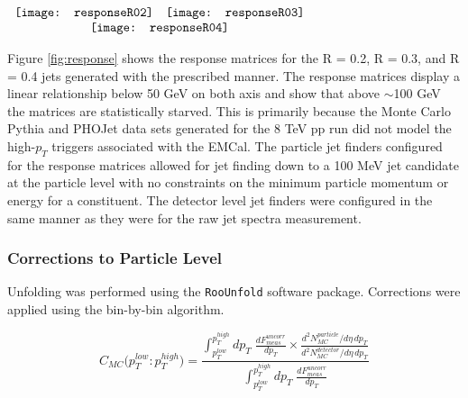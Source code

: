 \begin{figure*}[t!]
$\begin{array}{rl}
    \texttt{[image: responseR02]} &
    \texttt{[image: responseR03]}\\
    \multicolumn{2}{c}{\texttt{[image: responseR04]}}
\end{array}$
\caption[Response Matrices for R = 0.2, R=0.3, and R = 0.4 jets.]{\label{fig:response}Response Matrices for R = 0.2, R=0.3, and R = 0.4 jets.}
\end{figure*}

Figure \ref{fig:response} shows the response matrices for the R = 0.2, R = 0.3, and R = 0.4 jets generated with the prescribed manner.  The response matrices display a linear relationship below 50 GeV on both axis and show that above $\sim$100 GeV the matrices are statistically starved.  This is primarily because the Monte Carlo Pythia and PHOJet data sets generated for the 8 TeV pp run did not model the high-$p_{T}$ triggers associated with the EMCal.  The particle jet finders configured for the response matrices allowed for jet finding down to a 100 MeV jet candidate at the particle level with no constraints on the minimum particle momentum or energy for a constituent.  The detector level jet finders were configured in the same manner as they were for the raw jet spectra measurement.  

\subsubsection{Corrections to Particle Level}

Unfolding was performed using the \verb+RooUnfold+\cite{Adye:2011gm} software package.  Corrections were applied using the bin-by-bin\cite{Cowan:2002in} algorithm. 

\begin{equation}
C_{MC} \big( p_{T}^{low} : p_{T}^{high} \big) =  \frac{  \int^{p_{T}^{high}}_{p_{T}^{low}} dp_{T} \; \frac{dF^{uncorr}_{meas}}{dp_{T}} \times \frac{d^{2}N^{particle}_{MC}/d\eta \, dp_{T}}{d^{2}N^{detector}_{MC}/d\eta \, dp_{T}}  } { \int^{p_{T}^{high}}_{p_{T}^{low}} dp_{T} \; \frac{dF^{uncorr}_{meas}}{dp_{T}} }
\label{eq:binbybin}
\end{equation}

